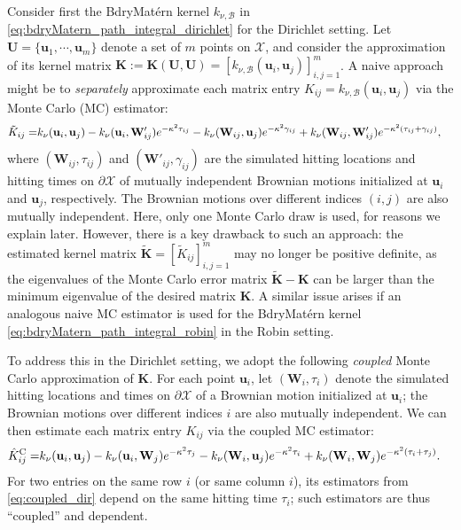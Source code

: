 \documentclass[aos,preprint]{imsart}
\theoremstyle{plain}
\newcommand{\Bu}{\bold u}
\theoremstyle{remark}
\begin{document}
Consider first the BdryMat\'ern kernel $k_{\nu,\mathcal{B}}$ in \eqref{eq:bdryMatern_path_integral_dirichlet} for the Dirichlet setting. Let $\mathbf{U} = \{\mathbf{u}_1, \cdots, \mathbf{u}_m\}$ denote a set of $m$ points on $\mathcal{X}$, and consider the approximation of its kernel matrix $\mathbf{K}:=\mathbf{K}(\mathbf{U},\mathbf{U}) = [k_{\nu,\mathcal{B}}(\mathbf{u}_i,\mathbf{u}_j)]_{i,j=1}^m$. A naive approach might be to \textit{separately} approximate each matrix entry $K_{ij} = k_{\nu,\mathcal{B}}(\mathbf{u}_i, \mathbf{u}_j)$ via the Monte Carlo (MC) estimator:
\small
   \begin{align}
    \begin{split}
        \tilde{K}_{ij}
        =  &k_{\nu}(\Bu_i,\Bu_j)-k_{\nu}(\Bu_i,\mathbf{W}'_{ij})e^{-\kappa^2\tau_{ij}} - k_{\nu}(\mathbf{W}_{ij},\Bu_j)e^{-\kappa^2\gamma_{ij}} + k_{\nu}(\mathbf{W}_{ij},\mathbf{W}'_{ij})e^{-\kappa^2(\tau_{ij}+\gamma_{ij})},
        \end{split}
        \label{eq:naive_dir}
    \end{align}
    \normalsize
where $(\mathbf{W}_{ij},\tau_{ij})$ and $(\mathbf{W}'_{ij},\gamma_{ij})$ are the simulated hitting locations and hitting times on $\partial \mathcal{X}$ of mutually independent Brownian motions initialized at $\mathbf{u}_i$ and $\mathbf{u}_j$, respectively. The Brownian motions over different indices $(i,j)$ are also mutually independent. Here, only one Monte Carlo draw is used, for reasons we explain later. However, there is a key drawback to such an approach: the estimated kernel matrix $\tilde{\mathbf{K}} = [\tilde{K}_{ij}]_{i,j=1}^m$ may no longer be positive definite, as the eigenvalues of the Monte Carlo error matrix $\tilde{\mathbf{K}}-\mathbf{K}$ can be larger than the minimum eigenvalue of the desired matrix $\mathbf{K}$. A similar issue arises if an analogous naive MC estimator is used for the BdryMat\'ern kernel \eqref{eq:bdryMatern_path_integral_robin} in the Robin setting.

To address this in the Dirichlet setting, we adopt the following \textit{coupled} Monte Carlo approximation of $\mathbf{K}$. For each point $\mathbf{u}_i$, let $(\mathbf{W}_{i},\tau_{i})$ denote the simulated hitting locations and times on $\partial \mathcal{X}$ of a Brownian motion initialized at $\mathbf{u}_i$; the Brownian motions over different indices $i$ are also mutually independent. We can then estimate each matrix entry $K_{ij}$ via the coupled MC estimator:
   \begin{align}
        \hat{K}_{ij}^{\rm C}
        =  &k_{\nu}(\mathbf{u}_i,\mathbf{u}_j)-k_{\nu}(\Bu_i,\mathbf{W}_{j})e^{-\kappa^2\tau_{j}} - k_{\nu}(\mathbf{W}_{i},\Bu_j)e^{-\kappa^2\tau_{i}}+k_{\nu}(\mathbf{W}_{i},\mathbf{W}_{j})e^{-\kappa^2(\tau_{i}+\tau_{j})}.
       \label{eq:coupled_dir}
    \end{align}
For two entries on the same row $i$ (or same column $i$), its estimators from \eqref{eq:coupled_dir} depend on the same hitting time $\tau_{i}$; such estimators are thus ``coupled'' and dependent.
\end{document}
